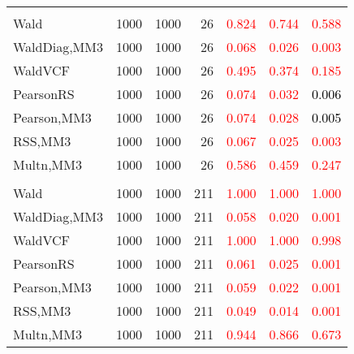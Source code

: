 \documentclass[
]{article}
\begin{document}
\begin{table}[H]
{\begin{tabular}[t]{lrrrrrr}
\addlinespace[0.3em]
\multicolumn{7}{l}{\textbf{2F 10V}}\\
\hspace{1em}Wald & 1000 & 1000 & 26 & \textcolor{red}{0.824} & \textcolor{red}{0.744} & \textcolor{red}{0.588}\\
\hspace{1em}WaldDiag,MM3 & 1000 & 1000 & 26 & \textcolor{red}{0.068} & \textcolor{red}{0.026} & \textcolor{red}{0.003}\\
\hspace{1em}WaldVCF & 1000 & 1000 & 26 & \textcolor{red}{0.495} & \textcolor{red}{0.374} & \textcolor{red}{0.185}\\
\hspace{1em}PearsonRS & 1000 & 1000 & 26 & \textcolor{red}{0.074} & \textcolor{red}{0.032} & \textcolor{black}{0.006}\\
\hspace{1em}Pearson,MM3 & 1000 & 1000 & 26 & \textcolor{red}{0.074} & \textcolor{red}{0.028} & \textcolor{black}{0.005}\\
\hspace{1em}RSS,MM3 & 1000 & 1000 & 26 & \textcolor{red}{0.067} & \textcolor{red}{0.025} & \textcolor{red}{0.003}\\
\hspace{1em}Multn,MM3 & 1000 & 1000 & 26 & \textcolor{red}{0.586} & \textcolor{red}{0.459} & \textcolor{red}{0.247}\\
\addlinespace[0.3em]
\multicolumn{7}{l}{\textbf{3F 15V}}\\
\hspace{1em}Wald & 1000 & 1000 & 211 & \textcolor{red}{1.000} & \textcolor{red}{1.000} & \textcolor{red}{1.000}\\
\hspace{1em}WaldDiag,MM3 & 1000 & 1000 & 211 & \textcolor{red}{0.058} & \textcolor{red}{0.020} & \textcolor{red}{0.001}\\
\hspace{1em}WaldVCF & 1000 & 1000 & 211 & \textcolor{red}{1.000} & \textcolor{red}{1.000} & \textcolor{red}{0.998}\\
\hspace{1em}PearsonRS & 1000 & 1000 & 211 & \textcolor{red}{0.061} & \textcolor{red}{0.025} & \textcolor{red}{0.001}\\
\hspace{1em}Pearson,MM3 & 1000 & 1000 & 211 & \textcolor{red}{0.059} & \textcolor{red}{0.022} & \textcolor{red}{0.001}\\
\hspace{1em}RSS,MM3 & 1000 & 1000 & 211 & \textcolor{red}{0.049} & \textcolor{red}{0.014} & \textcolor{red}{0.001}\\
\hspace{1em}Multn,MM3 & 1000 & 1000 & 211 & \textcolor{red}{0.944} & \textcolor{red}{0.866} & \textcolor{red}{0.673}\\
\bottomrule
\end{tabular}}
\endgroup{}
\end{table}
\end{document}
